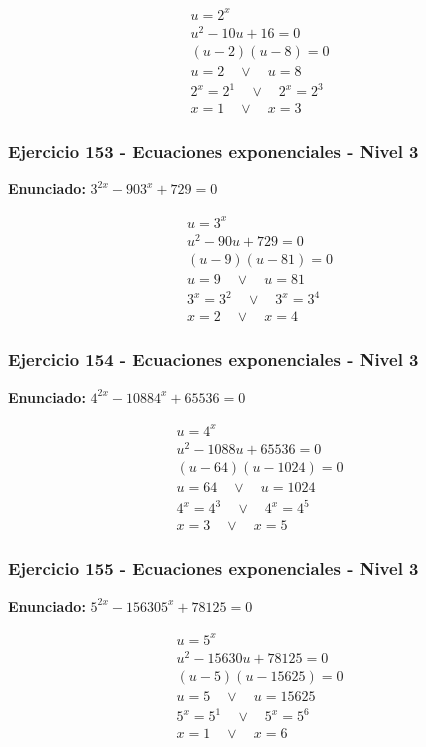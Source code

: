 \documentclass[12pt,a4paper]{article}
\begin{document}
\[
\begin{aligned}
u=2^x\\
u^2-10u+16=0\\
(u-2)(u-8)=0\\
u=2\quad \vee\quad u=8\\
2^x=2^{1}\quad \vee\quad 2^x=2^{3}\\
\boxed{x=1\quad \vee\quad x=3}
\end{aligned}
\]


\subsubsection*{Ejercicio 153 - Ecuaciones exponenciales - Nivel 3}
\textbf{Enunciado:} \(3^{2x}-903^x+729=0\)

\[
\begin{aligned}
u=3^x\\
u^2-90u+729=0\\
(u-9)(u-81)=0\\
u=9\quad \vee\quad u=81\\
3^x=3^{2}\quad \vee\quad 3^x=3^{4}\\
\boxed{x=2\quad \vee\quad x=4}
\end{aligned}
\]


\subsubsection*{Ejercicio 154 - Ecuaciones exponenciales - Nivel 3}
\textbf{Enunciado:} \(4^{2x}-10884^x+65536=0\)

\[
\begin{aligned}
u=4^x\\
u^2-1088u+65536=0\\
(u-64)(u-1024)=0\\
u=64\quad \vee\quad u=1024\\
4^x=4^{3}\quad \vee\quad 4^x=4^{5}\\
\boxed{x=3\quad \vee\quad x=5}
\end{aligned}
\]


\subsubsection*{Ejercicio 155 - Ecuaciones exponenciales - Nivel 3}
\textbf{Enunciado:} \(5^{2x}-156305^x+78125=0\)

\[
\begin{aligned}
u=5^x\\
u^2-15630u+78125=0\\
(u-5)(u-15625)=0\\
u=5\quad \vee\quad u=15625\\
5^x=5^{1}\quad \vee\quad 5^x=5^{6}\\
\boxed{x=1\quad \vee\quad x=6}
\end{aligned}
\]
\end{document}
